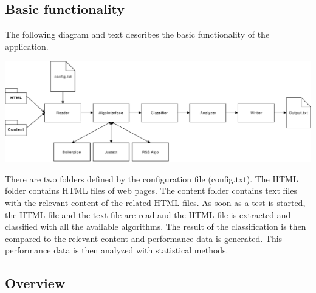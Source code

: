 \begin{landscape}

\subsection{Basic functionality}
The following diagram and text describes the basic functionality of the application.

\includegraphics[width=24cm]{Figures/App_overview.pdf}

There are two folders defined by the configuration file (config.txt). The HTML folder contains  HTML files of web pages. The content folder contains text files with the relevant content of the related HTML files. As soon as a test is started, the HTML file and the text file are read and the HTML file is extracted and classified with all the available algorithms. The result of the classification is then compared to the relevant content and performance data is generated. This performance data is then analyzed with statistical methods. 

\end{landscape}



\subsection{Overview}

